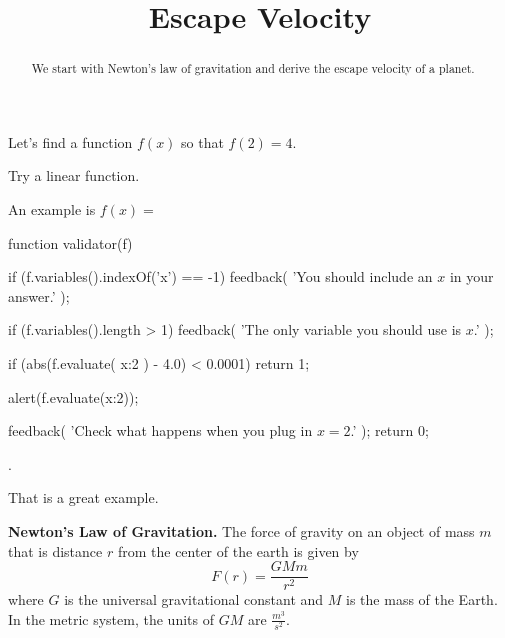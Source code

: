 \documentclass{ximera}
\title{Escape Velocity}
\begin{document}
\begin{abstract}
We start with Newton's law of gravitation and derive the escape velocity of a planet.
\end{abstract}
\maketitle


\begin{exercise}
Let's find a function $f(x)$ so that $f(2) = 4$.

\begin{solution}
\begin{hint}
Try a linear function.
\end{hint}
An example is $f(x) = $ \begin{expression-answer}
  function validator(f) {
    if (f.variables().indexOf('x') == -1) {
      feedback( 'You should include an $x$ in your answer.' );
    }

    if (f.variables().length > 1) {
      feedback( 'The only variable you should use is $x$.' );
    }

    if (abs(f.evaluate( {x:2} ) - 4.0) < 0.0001)
      return 1;

    alert(f.evaluate({x:2}));

    feedback( 'Check what happens when you plug in $x=2$.' );
    return 0;
  }
\end{expression-answer}.
\end{solution}

That is a great example.
\end{exercise}


\begin{observation}
\textbf{Newton's Law of Gravitation.} The force of gravity on an object of mass $m$ that is distance $r$ from the center of the earth is given by
$$ F(r) = \frac{G M m}{r^2}$$
where $G$ is the universal gravitational constant and $M$ is the mass of the Earth. In the metric system, the units of $G M$ are $\frac{m^3}{s^2}$.
\end{observation}
\end{document}
